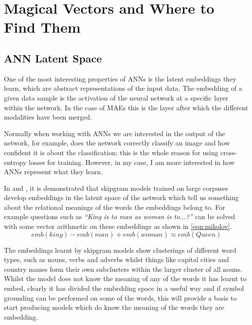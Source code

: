 
\chapter{Magical Vectors and Where to Find Them} %

\label{Chapter5} %


\section{ANN Latent Space}
One of the most interesting properties of \acp{ANN} is the latent embeddings they learn, which are abstract representations of the input data. The embedding of a given data sample is the activation of the neural network at a specific layer within the network. In the case of \acp{MAE} this is the layer after which the different modalities have been merged.

Normally when working with \acp{ANN} we are interested in the output of the network, for example, does the network correctly classify an image and how confident it is about the classification; this is the whole reason for using cross-entropy losses for training. However, in my case, I am more interested in how \acp{ANN} represent what they learn.

In \cite{mikolov2013distributed} and \cite{mikolov2013efficient}, it is demonstrated that skipgram models trained on large corpuses develop embeddings in the latent space of the network which tell us something about the relational meanings of the words the embeddings belong to. For example questions such as \textit{``King is to man as woman is to...?''} can be solved with some vector arithmetic on these embeddings as shown in \autoref{eqn:mikolov}.
\begin{equation}
emb(king) - emb(man) + emb(woman) \approx emb(Queen)
\label{eqn:mikolov}
\end{equation} 

The embeddings learnt by skipgram models show clusterings of different word types, such as nouns, verbs and adverbs whilst things like capital cities and country names form their own subclusters within the larger cluster of all nouns. Whilst the model does not know the meaning of any of the words it has learnt to embed, clearly it has divided the embedding space in a useful way and if symbol grounding can be performed on some of the words, this will provide a basis to start producing models which do know the meaning of the words they are embedding.

